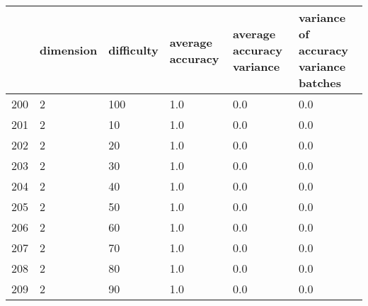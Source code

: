 \documentclass{article}
\begin{document}
\begin{center}
\begin{tabular}{llllll}
\toprule
{} & dimension & difficulty & average accuracy & average accuracy variance & variance of accuracy variance batches \\
\midrule
200 &         2 &        100 &              1.0 &                       0.0 &                                   0.0 \\
201 &         2 &         10 &              1.0 &                       0.0 &                                   0.0 \\
202 &         2 &         20 &              1.0 &                       0.0 &                                   0.0 \\
203 &         2 &         30 &              1.0 &                       0.0 &                                   0.0 \\
204 &         2 &         40 &              1.0 &                       0.0 &                                   0.0 \\
205 &         2 &         50 &              1.0 &                       0.0 &                                   0.0 \\
206 &         2 &         60 &              1.0 &                       0.0 &                                   0.0 \\
207 &         2 &         70 &              1.0 &                       0.0 &                                   0.0 \\
208 &         2 &         80 &              1.0 &                       0.0 &                                   0.0 \\
209 &         2 &         90 &              1.0 &                       0.0 &                                   0.0 \\
\bottomrule
\end{tabular}
\end{center}
\newpage
\end{document}
